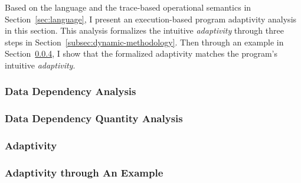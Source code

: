 
Based on the language and the trace-based operational semantics in Section~\ref{sec:language},
I present an execution-based program adaptivity analysis in this section.
This analysis formalizes the intuitive \emph{adaptivity} through three steps in 
Section~\ref{subsec:dynamic-methodology}.
Then through an example in Section~\ref{subsec:dynamic-examples}, I show that the formalized
adaptivity matches the program's intuitive \emph{adaptivity}.




\subsubsection{Data Dependency Analysis}
\label{subsubsec:dynamic-datadep}

\subsubsection{Data Dependency Quantity Analysis}
\label{subsubsec:dynamic-reachability}
%
\subsubsection{Adaptivity}
\label{subsubsec:dynamic-adapt}
%
%
\subsubsection{Adaptivity through An Example}
\label{subsec:dynamic-examples}

%

% 
%
%